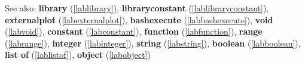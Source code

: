 See also: \textbf{library} (\ref{lablibrary}), \textbf{libraryconstant} (\ref{lablibraryconstant}), \textbf{externalplot} (\ref{labexternalplot}), \textbf{bashexecute} (\ref{labbashexecute}), \textbf{void} (\ref{labvoid}), \textbf{constant} (\ref{labconstant}), \textbf{function} (\ref{labfunction}), \textbf{range} (\ref{labrange}), \textbf{integer} (\ref{labinteger}), \textbf{string} (\ref{labstring}), \textbf{boolean} (\ref{labboolean}), \textbf{list of} (\ref{lablistof}), \textbf{object} (\ref{labobject})

